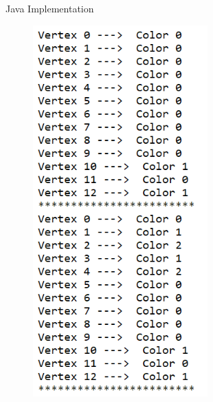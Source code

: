 \documentclass{beamer}
\begin{document}
\begin{frame}{Java Implementation}
\begin{figure}[htbp]
\begin{minipage}[t]{0.48\textwidth}
\includegraphics[width=0.6\textwidth]{figure/coloring.png}

\end{minipage}
\end{figure}
\end{frame}
\end{document}
